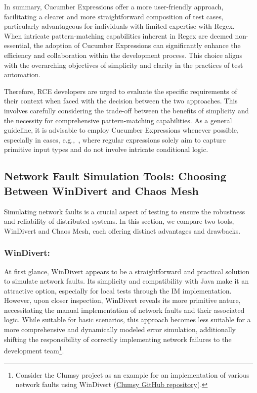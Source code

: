 In summary, Cucumber Expressions offer a more user-friendly approach, facilitating a clearer and more straightforward composition of test cases, particularly advantageous for individuals with limited expertise with Regex. When intricate pattern-matching capabilities inherent in Regex are deemed non-essential, the adoption of Cucumber Expressions can significantly enhance the efficiency and collaboration within the development process. This choice aligns with the overarching objectives of simplicity and clarity in the practices of test automation.

Therefore, \ac{RCE} developers are urged to evaluate the specific requirements of their context when faced with the decision between the two approaches. This involves carefully considering the trade-off between the benefits of simplicity and the necessity for comprehensive pattern-matching capabilities. As a general guideline, it is advisable to employ Cucumber Expressions whenever possible, especially in cases, e.g.,~, where regular expressions solely aim to capture primitive input types and do not involve intricate conditional logic.

\subsection{Network Fault Simulation Tools: Choosing Between WinDivert and Chaos Mesh}
\label{subsec:network-fault-wdiviert-chaos-mesh}
Simulating network faults is a crucial aspect of testing to ensure the robustness and reliability of distributed systems. In this section, we compare two tools, WinDivert and Chaos Mesh, each offering distinct advantages and drawbacks.

\subsubsection{WinDivert:}
At first glance, WinDivert appears to be a straightforward and practical solution to simulate network faults. Its simplicity and compatibility with Java make it an attractive option, especially for local tests through the \ac{IM} implementation. However, upon closer inspection, WinDivert reveals its more primitive nature, necessitating the manual implementation of network faults and their associated logic. While suitable for basic scenarios, this approach becomes less suitable for a more comprehensive and dynamically modeled error simulation, additionally shifting the responsibility of correctly implementing network failures to the development team\footnote{Consider the Clumsy project as an example for an implementation of various network faults using WinDivert (\href{https://github.com/jagt/clumsy}{Clumsy GitHub repository}).}.

